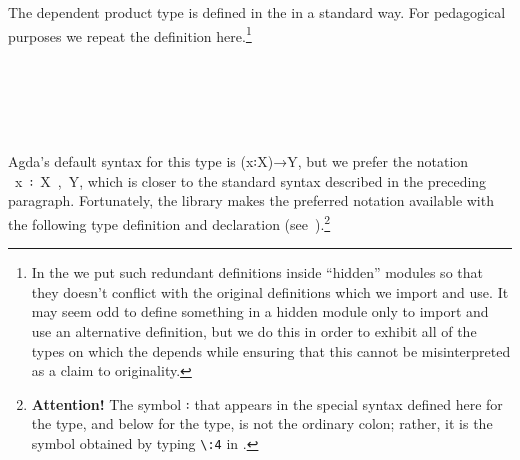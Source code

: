 The dependent product type is defined in the \typetopology in a standard way. For pedagogical purposes we repeat the definition here.\footnote{In the \ualib we put such redundant definitions inside ``hidden'' modules so that they doesn't conflict with the original definitions which we import and use. It may seem odd to define something in a hidden module only to import and use an alternative definition, but we do this in order to exhibit all of the types on which the \ualib depends while ensuring that this cannot be misinterpreted as a claim to originality.}
\ccpad
\begin{code}%
\>[1]\AgdaSpace{}%
\AgdaSpace{}%
\AgdaSymbol{\{}\AgdaSpace{}%
\AgdaSymbol{\}}\AgdaSpace{}%
\AgdaSymbol{\{}\AgdaSpace{}%
\AgdaSymbol{:}\AgdaSpace{}%
\AgdaSpace{}%
\AgdaSpace{}%
\AgdaSymbol{\}}\AgdaSpace{}%
\AgdaSymbol{(}\AgdaSpace{}%
\AgdaSymbol{:}\AgdaSpace{}%
\AgdaSpace{}%
\AgdaSpace{}%
\AgdaSpace{}%
\AgdaSpace{}%
\AgdaSymbol{)}\AgdaSpace{}%
\AgdaSymbol{:}\AgdaSpace{}%
\AgdaSpace{}%
\AgdaSpace{}%
\AgdaSpace{}%
%
\>[53]\<%
\\
\>[1][@{}l@{\AgdaIndent{0}}]%
\>[2]\AgdaSpace{}%
\AgdaOperator{\AgdaInductiveConstructor{\AgdaUnderscore{},\AgdaUnderscore{}}}\<%
\\
%
\>[2]\<%
\\
\>[2][@{}l@{\AgdaIndent{0}}]%
\>[3]\AgdaSpace{}%
\AgdaSymbol{:}\AgdaSpace{}%
\<%
\\
%
\>[3]\AgdaSpace{}%
\AgdaSymbol{:}\AgdaSpace{}%
\AgdaSpace{}%
\<%
\end{code}
\ccpad
Agda's default syntax for this type is (\ab x꞉\ab X)\as →\ab Y, but we prefer the notation ~\ab x~꞉~\ab X~,~\ab Y, which is closer to the standard syntax described in the preceding paragraph. Fortunately, the \typetopology library makes the preferred notation available with the following type definition and  declaration (see~\cite[Σ types]{MHE}).\footnote{\label{fncolon}\textbf{Attention!} The symbol \af ꞉ that appears in the special syntax defined here for the  type, and below for the  type, is not the ordinary colon; rather, it is the symbol obtained by typing \texttt{\textbackslash{}:4} in \agdatwomode.} 
